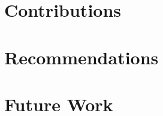 \section{Contributions}
\label{sec:concl_contributions}

%
%
%
%
%
%


\section{Recommendations}
\label{sec:concl_recommendations}

%
%
%
%


\section{Future Work}
\label{sec:concl_future}

%
%
%
%


